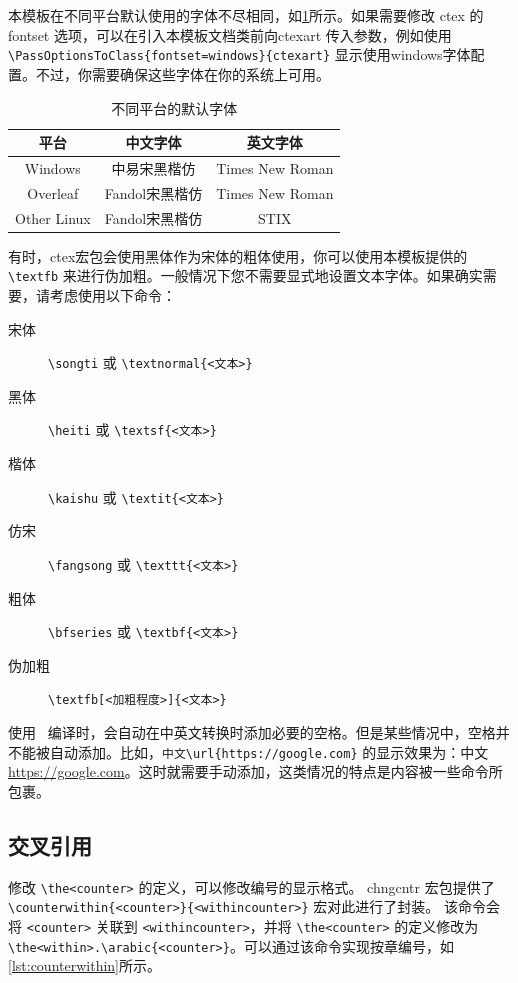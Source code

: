 \documentclass{nktba}
\begin{document}
本模板在不同平台默认使用的字体不尽相同，如\ref{tab:ctex-fontset}所示。如果需要修改 ctex 的 fontset 选项，可以在引入本模板文档类前向ctexart 传入参数，例如使用 \verb| \PassOptionsToClass{fontset=windows}{ctexart}| 显示使用windows字体配置。不过，你需要确保这些字体在你的系统上可用。

\begin{table}
  \centering
  \caption{不同平台的默认字体}
  \begin{tabular}{ccc}
  \toprule
  平台 & 中文字体 & 英文字体 \\
  \midrule
  Windows & 中易宋黑楷仿 & Times New Roman \\
  Overleaf & Fandol宋黑楷仿 & Times New Roman\\
  Other Linux & Fandol宋黑楷仿 & STIX \\
  \bottomrule
  \end{tabular}
  \label{tab:ctex-fontset}
\end{table}

有时，ctex宏包会使用黑体作为宋体的粗体使用，你可以使用本模板提供的\verb|\textfb| 来进行伪加粗。一般情况下您不需要显式地设置文本字体。如果确实需要，请考虑使用以下命令：

\begin{description}
\item[宋体] \verb|\songti| 或 \verb|\textnormal{<文本>}|
\item[黑体] \verb|\heiti| 或 \verb|\textsf{<文本>}|
\item[楷体] \verb|\kaishu|  或 \verb|\textit{<文本>}|
\item[仿宋] \verb|\fangsong| 或 \verb|\texttt{<文本>}|
\item[粗体] \verb|\bfseries| 或 \verb|\textbf{<文本>}|
\item[伪加粗] \verb|\textfb[<加粗程度>]{<文本>}|
\end{description}

使用 \ 编译时，会自动在中英文转换时添加必要的空格。但是某些情况中，空格并不能被自动添加。比如，\verb|中文\url{https://google.com}| 的显示效果为：中文\url{https://google.com}。这时就需要手动添加，这类情况的特点是内容被一些命令所包裹。

\subsection{交叉引用} \label{sec:ex:A}

修改 \verb|\the<counter>| 的定义，可以修改编号的显示格式。 chngcntr 宏包提供了 \verb|\counterwithin{<counter>}{<withincounter>}| 宏对此进行了封装。 该命令会将 \verb|<counter>| 关联到 \verb|<withincounter>|，并将 \verb|\the<counter>| 的定义修改为 \verb|\the<within>.\arabic{<counter>}|。可以通过该命令实现按章编号，如\ref{lst:counterwithin}所示。
\end{document}
